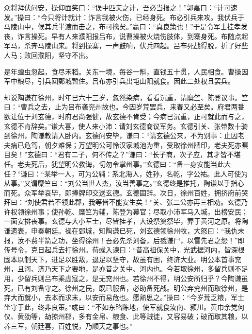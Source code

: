 众将拜伏问安，操仰面笑曰：“误中匹夫之计，吾必当报之！”郭嘉曰：“计可速发。”操曰：“今只将计就计：诈言我被火伤，已经身死。布必引兵来攻。我伏兵于马陵山中，候其兵半渡而击之，布可擒矣。”赢曰：“真良策也！”于是令军士挂孝发丧，诈言操死。早有人来濮阳报吕布，说曹操被火烧伤肢体，到寨身死。布随点起军马，杀奔马陵山来。将到操寨，一声鼓响，伏兵四起。吕布死战得脱，折了好些人马；败回濮阳，坚守不出。

是年蝗虫忽起，食尽禾稻。关东一境，每谷一斛，直钱五十贯，人民相食。曹操因军中粮尽，引兵回鄄城暂住。吕布亦引兵出屯山阳就食。因此二处权且罢兵。

却说陶谦在徐州，时年已六十三岁，忽然染病，看看沉重，请糜竺、陈登议事。竺曰：“曹兵之去，止为吕布袭兖州故也。今因岁荒罢兵，来春又必至矣。府君两番欲让位于刘玄德，时府君尚强健，故玄德不肯受；今病已沉重，正可就此而与之，玄德不肯辞矣。”谦大喜，使人来小沛：请刘玄德商议军务。玄德引关、张带数十骑到徐州，陶谦教请入卧内。玄德问安毕，谦曰：“请玄德公来，不为别事：止因老夫病已危笃，朝夕难保；万望明公可怜汉家城池为重，受取徐州牌印，老夫死亦瞑目矣！”玄德曰：“君有二子，何不传之？”谦曰：“长子商，次子应，其才皆不堪任。老夫死后，犹望明公教诲，切勿令掌州事。”玄德曰：“备一身安能当此大任？”谦曰：“某举一人，可为公辅：系北海人，姓孙，名乾，字公祐。此人可使为从事。”又谓糜竺曰：“刘公当世人杰，汝当善事之。”玄德终是推托，陶谦以手指心而死。众军举哀毕，即捧牌印交送玄德。玄德固辞。次日，徐州百姓，拥挤府前哭拜曰：“刘使君若不领此郡，我等皆不能安生矣！”关、张二公亦再三相劝。玄德乃许权领徐州事；使孙乾、糜竺为辅，陈登为幕官；尽取小沛军马入城，出榜安民；一面安排丧事。玄德与大小军士，尽皆挂孝，大设祭奠祭毕，葬于黄河之原。将陶谦遗表，申奏朝廷。操在鄄城，知陶谦已死，刘玄德领徐州牧，大怒曰：“我仇未报，汝不费半箭之功，坐得徐州！吾必先杀刘备，后戮谦尸，以雪先君之怨！”即传号令，克日起兵去打徐州。荀彧入谏曰：“昔高祖保关中，光武据河内，皆深根固本以制天下，进足以胜敌，退足以坚守，故虽有困，终济大业。明公本首事兖州，且河、济乃天下之要地，是亦昔之关中、河内也。今若取徐州，多留兵则不足用，少留兵则吕布乘虚寇之，是无兖州也。若徐州不得，明公安所归乎？今陶谦虽死，已有刘备守之。徐州之民，既已服备，必助备死战。明公弃兖州而取徐州，是弃大而就小，去本而求末，以安而易危也。愿熟思之。”操曰：“今岁荒乏粮，军士坐守于此，终非良策。”彧曰：“不如东略陈地，使军就食汝南、颍川。黄巾余党何仪、黄劭等，劫掠州郡，多有金帛、粮食、此等贼徒，又容易破；破而取其粮，以养三军，朝廷喜，百姓悦，乃顺天之事也。”

